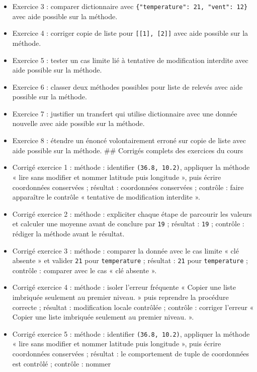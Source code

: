 \begin{itemize}
\item
  Exercice 3 : comparer dictionnaire avec
  \texttt{\{"temperature":\ 21,\ "vent":\ 12\}} avec aide possible sur
  la méthode.
\item
  Exercice 4 : corriger copie de liste pour
  \texttt{{[}{[}1{]},\ {[}2{]}{]}} avec aide possible sur la méthode.
\item
  Exercice 5 : tester un cas limite lié à tentative de modification
  interdite avec aide possible sur la méthode.
\item
  Exercice 6 : classer deux méthodes possibles pour liste de relevés
  avec aide possible sur la méthode.
\item
  Exercice 7 : justifier un transfert qui utilise dictionnaire avec une
  donnée nouvelle avec aide possible sur la méthode.
\item
  Exercice 8 : étendre un énoncé volontairement erroné sur copie de
  liste avec aide possible sur la méthode. \#\# Corrigés complets des
  exercices du cours
\item
  Corrigé exercice 1 : méthode : identifier \texttt{(36.8,\ 10.2)},
  appliquer la méthode « lire sans modifier et nommer latitude puis
  longitude », puis écrire coordonnées conservées ; résultat :
  coordonnées conservées ; contrôle : faire apparaître le contrôle «
  tentative de modification interdite ».
\item
  Corrigé exercice 2 : méthode : expliciter chaque étape de parcourir
  les valeurs et calculer une moyenne avant de conclure par \texttt{19}
  ; résultat : \texttt{19} ; contrôle : rédiger la méthode avant le
  résultat.
\item
  Corrigé exercice 3 : méthode : comparer la donnée avec le cas limite «
  clé absente » et valider \texttt{21} pour \texttt{temperature} ;
  résultat : \texttt{21} pour \texttt{temperature} ; contrôle : comparer
  avec le cas « clé absente ».
\item
  Corrigé exercice 4 : méthode : isoler l'erreur fréquente « Copier une
  liste imbriquée seulement au premier niveau. » puis reprendre la
  procédure correcte ; résultat : modification locale contrôlée ;
  contrôle : corriger l'erreur « Copier une liste imbriquée seulement au
  premier niveau. ».
\item
  Corrigé exercice 5 : méthode : identifier \texttt{(36.8,\ 10.2)},
  appliquer la méthode « lire sans modifier et nommer latitude puis
  longitude », puis écrire coordonnées conservées ; résultat : le
  comportement de tuple de coordonnées est contrôlé ; contrôle : nommer

\end{itemize}
